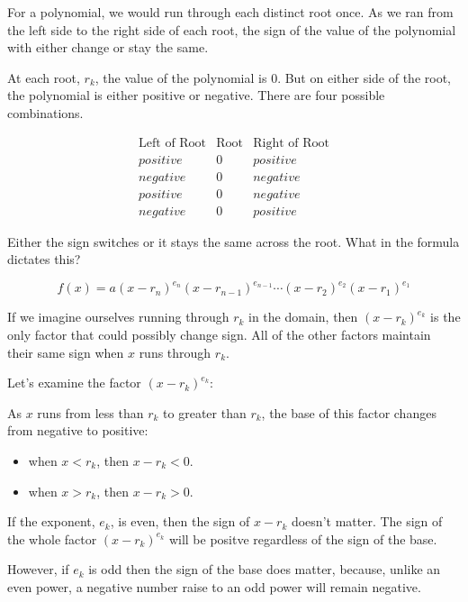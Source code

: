 \documentclass{ximera}
\begin{document}
For a polynomial, we would run through each distinct root once.  As we ran from the left side to the right side of each root, the sign of the value of the polynomial with either change or stay the same.

At each root, $r_k$, the value of the polynomial is $0$.  But on either side of the root, the polynomial is either positive or negative. There are four possible combinations.


\[
\begin{array}{rcl}
\text{Left of Root}  & \text{Root}  & \text{Right of Root} \\
positive & 0 & positive \\
negative & 0 & negative \\
positive & 0 & negative \\
negative & 0 & positive
\end{array}
\]


Either the sign switches or it stays the same across the root.  What in the formula dictates this?



\[   f(x) = a (x-r_n)^{e_n} (x-r_{n-1})^{e_{n-1}}  \cdots (x-r_2)^{e_2} (x-r_1)^{e_1}  \]


If we imagine ourselves running through $r_k$ in the domain, then $(x-r_k)^{e_k}$ is the only factor that could possibly change sign.  All of the other factors maintain their same sign when $x$ runs through $r_k$.



Let's examine the factor $(x-r_k)^{e_k}$:

As $x$ runs from less than $r_k$ to greater than $r_k$, the base of this factor changes from negative to positive:

\begin{itemize}
\item when $x<r_k$, then $x-r_k <0$.  \\

\item when $x>r_k$, then $x-r_k >0$. \\
\end{itemize}


If the exponent, $e_k$, is even, then the sign of $x-r_k$ doesn't matter. The sign of the whole factor $(x-r_k)^{e_k}$ will be positve regardless of the sign of the base.

However, if $e_k$ is odd then the sign of the base does matter, because, unlike an even power, a negative number raise to an odd power will remain negative.
\end{document}
